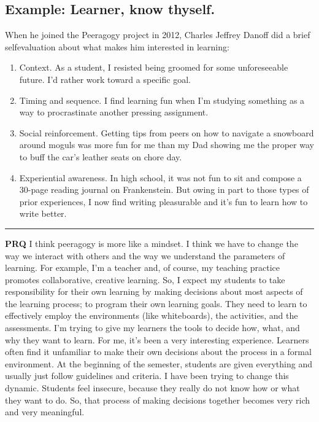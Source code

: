 \hypertarget{example-learner-know-thyself.}{%
\subsection{Example: Learner, know
thyself.}\label{example-learner-know-thyself.}}

When he joined the Peeragogy project in 2012, Charles Jeffrey Danoff did
a brief self­evaluation about what makes him interested in learning:

\begin{enumerate}
\def\labelenumi{\arabic{enumi}.}
\item
  Context. As a student, I resisted being groomed for some unforeseeable
  future. I'd rather work toward a specific goal.
\item
  Timing and sequence. I find learning fun when I'm studying something
  as a way to procrastinate another pressing assignment.
\item
  Social reinforcement. Getting tips from peers on how to navigate a
  snowboard around moguls was more fun for me than my Dad showing me the
  proper way to buff the car's leather seats on chore day.
\item
  Experiential awareness. In high school, it was not fun to sit and
  compose a 30-page reading journal on Frankenstein. But owing in part
  to those types of prior experiences, I now find writing pleasurable
  and it's fun to learn how to write better.
\end{enumerate}

\begin{center}\rule{0.5\linewidth}{0.5pt}\end{center}

\textbf{PRQ} I think peeragogy is more like a mind­set. I think we have
to change the way we interact with others and the way we understand the
parameters of learning. For example, I'm a teacher and, of course, my
teaching practice promotes collaborative, creative learning. So, I
expect my students to take responsibility for their own learning by
making decisions about most aspects of the learning process; to program
their own learning goals. They need to learn to effectively employ the
environments (like whiteboards), the activities, and the assessments.
I'm trying to give my learners the tools to decide how, what, and why
they want to learn. For me, it's been a very interesting experience.
Learners often find it unfamiliar to make their own decisions about the
process in a formal environment. At the beginning of the semester,
students are given everything and usually just follow guidelines and
criteria. I have been trying to change this dynamic. Students feel
insecure, because they really do not know how or what they want to do.
So, that process of making decisions together becomes very rich and very
meaningful.

